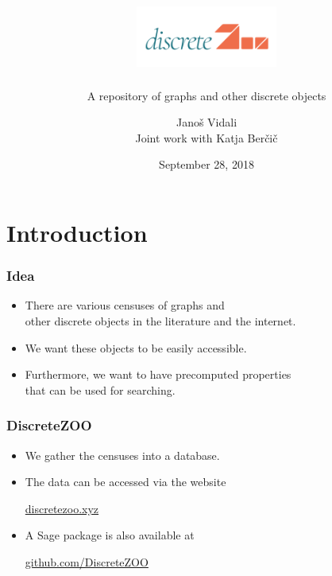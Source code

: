 \documentclass[usepdftitle=false]{beamer}
\title[DiscreteZOO]{\includegraphics[height=2cm]{discretezoo.png}}
\subtitle{A repository of graphs and other discrete objects}
\author{%
  Janoš Vidali \\
  {\scriptsize Joint work with Katja Berčič}
}
\date{September 28, 2018}
\newcommand{\keyw}[1]{\textcolor{zooteal}{#1}}
\newcommand{\con}[1]{\textcolor{zoored}{#1}}
\begin{document}
{
\section{Introduction}
\frame[plain]{
\titlepage
}
}

\frame
{
    \frametitle{Idea}

    \begin{itemize}
    \itemsep=5mm
    \item There are various \keyw{censuses} of graphs and \\
    other discrete objects in the literature and the internet.
    \item We want these objects to be \keyw{easily accessible}.
    \item Furthermore, we want to have \keyw{precomputed properties} \\
    that can be used for \keyw{searching}.
    \end{itemize}
}

\frame
{
    \frametitle{DiscreteZOO}

    \begin{itemize}
    \itemsep=5mm
    \item We gather the censuses into a \keyw{database}.
    \item The data can be accessed via the website
    \begin{center}
    \vskip 0.2cm
    \Large \con{\href{http://discretezoo.xyz}{discretezoo.xyz}}
    \end{center}
    \item A \keyw{Sage} package is also available at
    \begin{center}
    \vskip 0.2cm
    \Large \con{\href{https://github.com/DiscreteZOO}{github.com/DiscreteZOO}}
    \end{center}
    \end{itemize}
}
\end{document}
